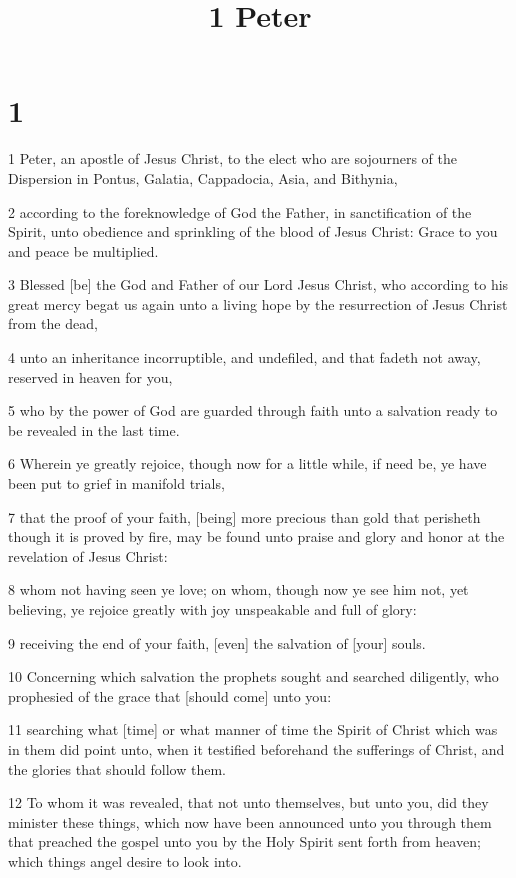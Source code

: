 

\title{1 Peter}

\chapter{1}

\par 1 Peter, an apostle of Jesus Christ, to the elect who are sojourners of the Dispersion in Pontus, Galatia, Cappadocia, Asia, and Bithynia,
\par 2 according to the foreknowledge of God the Father, in sanctification of the Spirit, unto obedience and sprinkling of the blood of Jesus Christ: Grace to you and peace be multiplied.
\par 3 Blessed [be] the God and Father of our Lord Jesus Christ, who according to his great mercy begat us again unto a living hope by the resurrection of Jesus Christ from the dead,
\par 4 unto an inheritance incorruptible, and undefiled, and that fadeth not away, reserved in heaven for you,
\par 5 who by the power of God are guarded through faith unto a salvation ready to be revealed in the last time.
\par 6 Wherein ye greatly rejoice, though now for a little while, if need be, ye have been put to grief in manifold trials,
\par 7 that the proof of your faith, [being] more precious than gold that perisheth though it is proved by fire, may be found unto praise and glory and honor at the revelation of Jesus Christ:
\par 8 whom not having seen ye love; on whom, though now ye see him not, yet believing, ye rejoice greatly with joy unspeakable and full of glory:
\par 9 receiving the end of your faith, [even] the salvation of [your] souls.
\par 10 Concerning which salvation the prophets sought and searched diligently, who prophesied of the grace that [should come] unto you:
\par 11 searching what [time] or what manner of time the Spirit of Christ which was in them did point unto, when it testified beforehand the sufferings of Christ, and the glories that should follow them.
\par 12 To whom it was revealed, that not unto themselves, but unto you, did they minister these things, which now have been announced unto you through them that preached the gospel unto you by the Holy Spirit sent forth from heaven; which things angel desire to look into.
